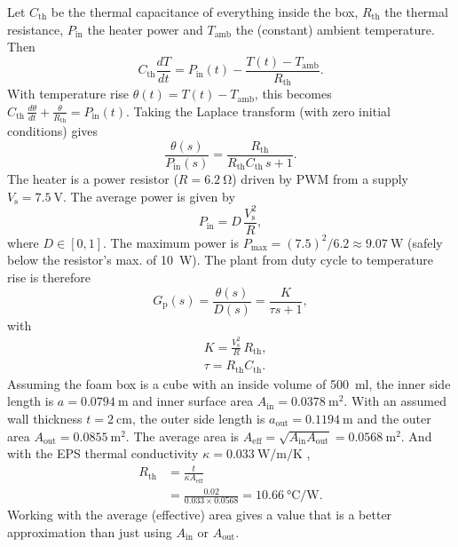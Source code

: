 \documentclass[10pt, a4paper, twocolumn]{article}
\newcommand{\upsub}[1]{_{\mathrm{#1}}}
\begin{document}
	Let $C\upsub{th}$ be the thermal capacitance of everything inside the box, $R\upsub{th}$ the thermal resistance, $P\upsub{in}$ the heater power and $T\upsub{amb}$ the (constant) ambient temperature. Then
	\begin{equation}
		C\upsub{th}\frac{dT}{dt} = P\upsub{in}(t) - \frac{T(t)-T\upsub{amb}}{R\upsub{th}}.
	\end{equation}
	With temperature rise $\theta(t) = T(t) - T\upsub{amb}$, this becomes $C\upsub{th}\,\frac{d\theta}{dt} + \frac{\theta}{R\upsub{th}} = P\upsub{in}(t)$. Taking the Laplace transform (with zero initial conditions) gives
	\begin{equation}
		\frac{\theta(s)}{P\upsub{in}(s)} = \frac{R\upsub{th}}{R\upsub{th}C\upsub{th}\,s + 1}.
	\end{equation}
	The heater is a power resistor ($R = \qty{6.2}{\ohm}$) driven by PWM from a supply $V\upsub{s} = \qty{7.5}{\volt}$. The average power is given by
	\begin{equation}
		P\upsub{in} = D\,\frac{V\upsub{s}^2}{R},
	\end{equation}
	where $D \in [0,1]$. The maximum power is $P\upsub{max} = (7.5)^2/6.2 \approx \qty{9.07}{\watt}$ (safely below the resistor's max. of \qty{10}{\watt}). The plant from duty cycle to temperature rise is therefore
	\begin{equation}
		G\upsub{p}(s) = \frac{\theta(s)}{D(s)} = \frac{K}{\tau s + 1},
	\end{equation}
	with
	\begin{equation}
		\begin{aligned}
			&K = \frac{V\upsub{s}^2}{R}\,R\upsub{th}, \\
			&\tau = R\upsub{th}C\upsub{th}.
		\end{aligned}
	\end{equation}
	Assuming the foam box is a cube with an inside volume of \qty{500}{\ml}, the inner side length is $a = \qty{0.0794}{\meter}$ and inner surface area $A\upsub{in} = \qty{0.0378}{\meter\squared}$. With an assumed wall thickness $t = \qty{2}{\cm}$, the outer side length is $a\upsub{out} = \qty{0.1194}{\meter}$ and the outer area $A\upsub{out} = \qty{0.0855}{\meter\squared}$. The average area is $A\upsub{eff} = \sqrt{A\upsub{in}A\upsub{out}} = \qty{0.0568}{\meter\squared}$. And with the EPS thermal conductivity $\kappa = \qty{0.033}{\watt\per\meter\per\kelvin}$ \cite{Haynes2016},
	\begin{equation}
		\begin{aligned}
			R\upsub{th} &= \frac{t}{\kappa A\upsub{eff}} \\
			&= \frac{0.02}{0.033 \times 0.0568} = \qty{10.66}{\degreeCelsius\per\watt}.
		\end{aligned}
	\end{equation}
	Working with the average (effective) area gives a value that is a better approximation than just using $A\upsub{in}$ or $A\upsub{out}$.
	
\end{document}
